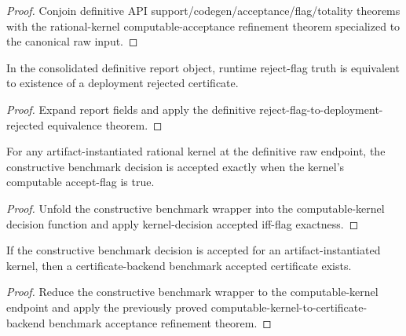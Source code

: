 \begin{proof}
Conjoin definitive API support/codegen/acceptance/flag/totality theorems with the rational-kernel computable-acceptance refinement theorem specialized to the canonical raw input.
\end{proof}

\begin{theorem}\label{thm:definitive-report-runtime-reject-iff-deployment-rejected}
In the consolidated definitive report object, runtime reject-flag truth is equivalent to existence of a deployment rejected certificate.
\end{theorem}

\begin{proof}
Expand report fields and apply the definitive reject-flag-to-deployment-rejected equivalence theorem.
\end{proof}

\begin{theorem}
\label{thm:definitive-constructive-benchmark-iff-kernel-flag}
For any artifact-instantiated rational kernel at the definitive raw endpoint, the constructive benchmark decision is accepted exactly when the kernel's computable accept-flag is true.
\end{theorem}

\begin{proof}
Unfold the constructive benchmark wrapper into the computable-kernel decision function and apply kernel-decision accepted iff-flag exactness.
\end{proof}

\begin{theorem}
\label{thm:definitive-constructive-benchmark-refines-certificate-backend-benchmark}
If the constructive benchmark decision is accepted for an artifact-instantiated kernel, then a certificate-backend benchmark accepted certificate exists.
\end{theorem}

\begin{proof}
Reduce the constructive benchmark wrapper to the computable-kernel endpoint and apply the previously proved computable-kernel-to-certificate-backend benchmark acceptance refinement theorem.
\end{proof}

